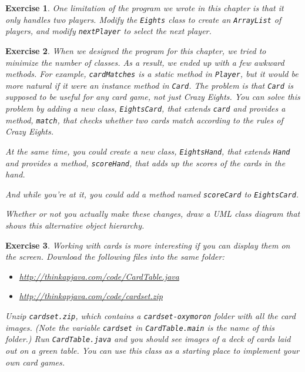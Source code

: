 \documentclass[12pt]{book}
\theoremstyle{exercise}
\newtheorem{exercise}{Exercise}[chapter]
\newcommand{\java}[1]{\verb"#1"}
\newcommand{\java}[1]{\lstinline{#1}} %
\begin{document}
\begin{exercise}
One limitation of the program we wrote in this chapter is that it only handles two players.
Modify the \java{Eights} class to create an \java{ArrayList} of players, and modify \java{nextPlayer} to select the next player.
\end{exercise}


\begin{exercise}
When we designed the program for this chapter, we tried to minimize the number of classes.
As a result, we ended up with a few awkward methods.
For example, \java{cardMatches} is a static method in \java{Player}, but it would be more natural if it were an instance method in \java{Card}.
The problem is that \java{Card} is supposed to be useful for any card game, not just {\em Crazy Eights}.
You can solve this problem by adding a new class, \java{EightsCard}, that extends \java{card} and provides a method, \java{match}, that checks whether two cards match according to the rules of {\em Crazy Eights}.

At the same time, you could create a new class, \java{EightsHand}, that extends \java{Hand} and provides a method, \java{scoreHand}, that adds up the scores of the cards in the hand.

And while you're at it, you could add a method named \java{scoreCard} to \java{EightsCard}.

Whether or not you actually make these changes, draw a UML class diagram that shows this alternative object hierarchy.
\end{exercise}


\begin{exercise}

Working with cards is more interesting if you can display them on the screen.
Download the following files into the same folder:

\begin{itemize}

\item \url{http://thinkapjava.com/code/CardTable.java}

\item \url{http://thinkapjava.com/code/cardset.zip}

\end{itemize}

Unzip {\tt cardset.zip}, which contains a {\tt cardset-oxymoron} folder with all the card images.
(Note the variable \java{cardset} in \java{CardTable.main} is the name of this folder.)
Run \java{CardTable.java} and you should see images of a deck of cards laid out on a green table.
You can use this class as a starting place to implement your own card games.

\end{exercise}
\end{document}
